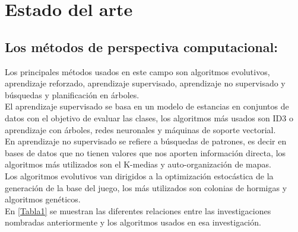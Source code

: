 \chapter[Estado del arte]{\label{identificadorReferenciaCruzada}
Estado del arte}

\section{Los métodos de perspectiva computacional:}

Los principales métodos usados en este campo son algoritmos evolutivos, aprendizaje reforzado, aprendizaje supervisado, aprendizaje no supervisado y búsquedas y planificación en árboles.\\

El aprendizaje supervisado se basa en un modelo de estancias en conjuntos de datos con el objetivo de evaluar las clases, los algoritmos más usados son ID3 o aprendizaje con árboles, redes neuronales y máquinas de soporte vectorial.\\
	
En aprendizaje no supervisado se refiere a búsquedas de patrones, es decir en bases de datos que no tienen valores que nos aporten información directa, los algoritmos más utilizados son el K-medias y auto-organización de mapas.\\

Los algoritmos evolutivos van dirigidos a la optimización estocástica de la generación de la base del juego, los más utilizados son colonias de hormigas y algoritmos genéticos.\\

En \ref{Tabla1} se muestran las diferentes relaciones entre las investigaciones nombradas anteriormente y los algoritmos usados en esa investigación.\\


